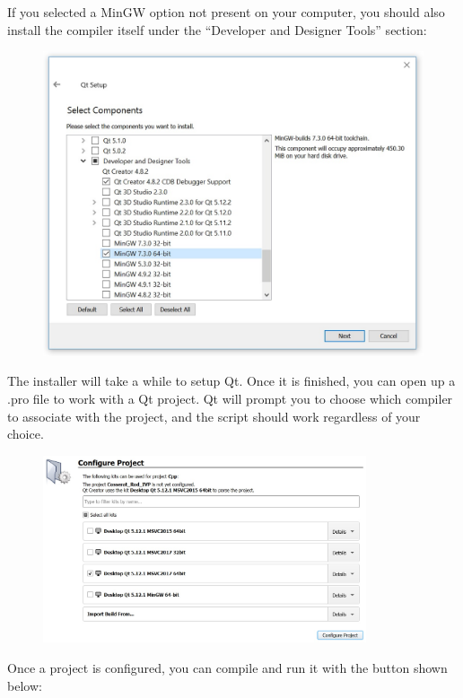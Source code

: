 \documentclass[12pt]{article}
\begin{document}
If you selected a MinGW option not present on your computer, you should also install the compiler itself under the ``Developer and Designer Tools'' section:

\begin{figure}[h]
	\centering
		\includegraphics[width=1.00\textwidth]{fig/installer_mingw.jpg}
\end{figure}
\clearpage

The installer will take a while to setup Qt. Once it is finished, you can open up a .pro file to work with a Qt project. Qt will prompt you to choose which compiler to associate with the project, and the script should work regardless of your choice.

\begin{figure}[h]
	\centering
		\includegraphics[width=0.85\textwidth]{fig/configuration.jpg}
\end{figure}

Once a project is configured, you can compile and run it with the button shown below:
\end{document}

